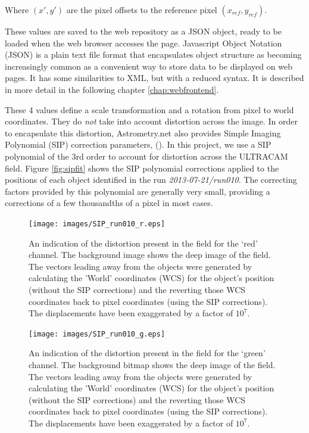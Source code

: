 Where $(x', y')$ are the pixel offsets to the reference pixel $(x_{ref}, y_{ref})$.

These values are saved to the web repository as a JSON object, ready to be loaded when the web browser accesses the page. Javascript Object Notation (JSON) is a plain text file format that encapsulates object structure as becoming increasingly common as a convenient way to store data to be displayed on web pages. It has some similarities to XML, but with a reduced syntax. It is described in more detail in the following chapter \ref{chap:webfrontend}.

These 4 values define a scale transformation and a rotation from pixel to world coordinates. They do \emph{not} take into account distortion across the image. In order to encapsulate this distortion, Astrometry.net also provides Simple Imaging Polynomial (SIP) correction parameters, (\cite{sippolynomial}). In this project, we use a SIP polynomial of the 3rd order to account for distortion across the ULTRACAM field. Figure \ref{fig:sipfit} shows the SIP polynomial corrections applied to the positions of each object identified in the run \emph{2013-07-21/run010}. The correcting factors provided by this polynomial are generally very small, providing a corrections of a few thousandths of a pixel in most cases. 

\begin{figure}
  \centering
  \texttt{[image: images/SIP\_run010\_r.eps]}
  \caption{An indication of the distortion present in the field for the `red' channel. The background image shows the deep image of the field. The vectors leading away from the objects were generated by calculating the 'World' coordinates (WCS) for the object's position (without the SIP corrections) and the reverting those WCS coordinates back to pixel coordinates (using the SIP corrections). The displacements have been exaggerated by a factor of $10^7$.}
\label{fig:sipfitr}
\end{figure}
  
\begin{figure}
  \centering
  \texttt{[image: images/SIP\_run010\_g.eps]}
  \caption{An indication of the distortion present in the field for the `green' channel. The background bitmap shows the deep image of the field. The vectors leading away from the objects were generated by calculating the 'World' coordinates (WCS) for the object's position (without the SIP corrections) and the reverting those WCS coordinates back to pixel coordinates (using the SIP corrections). The displacements have been exaggerated by a factor of $10^7$.}
\label{fig:sipfitg}
\end{figure}
  
